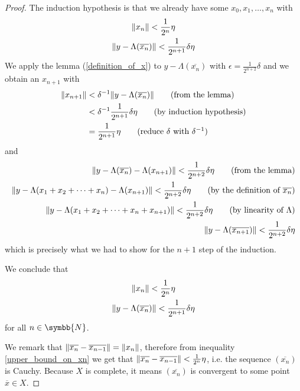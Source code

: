 \documentclass[a4paper, 12pt]{article}
\theoremstyle{definition}
\newcommand{\naturals}{\symbb{N}}
\DeclarePairedDelimiter{\norm}{\lVert}{\rVert}
\begin{document}
\begin{proof}
The induction hypothesis is that we already have some \(x_0, x_1, \dots, x_n\) with
\begin{gather*}
    \norm{x_n} < \frac{1}{2^n} \eta \\
    \norm{y - \Lambda(\overline{x_n})} < \frac{1}{2^{n + 1}} \delta\eta
\end{gather*}
We apply the lemma (\ref{definition_of_x}) to \(y - \Lambda(\overline{x_n})\) with \(\epsilon = \frac{1}{2^{n + 2}} \delta\) and we obtain an \(x_{n + 1}\) with
\begin{align*}
    \norm{x_{n + 1}} &< \delta^{-1} \norm{y - \Lambda(\overline{x_n})} \tag{from the lemma} \\
    &< \delta^{-1} \frac{1}{2^{n + 1}} \delta \eta \tag{by induction hypothesis} \\
    &= \frac{1}{2^{n + 1}} \eta \tag{reduce \(\delta\) with \(\delta^{-1}\)}
\end{align*}
and
\begin{align*}
    \norm{y - \Lambda(\overline{x_n}) - \Lambda(x_{n + 1})}  < \frac{1}{2^{n + 2}} \delta \eta \tag{from the lemma} \\
    \norm{y - \Lambda(x_1 + x_2 + \dots + x_n) - \Lambda(x_{n + 1})} < \frac{1}{2^{n + 2}} \delta \eta \tag{by the definition of \(\overline{x_n}\)} \\
    \norm{y - \Lambda(x_1 + x_2 + \dots + x_n + x_{n + 1})} < \frac{1}{2^{n + 2}} \delta \eta \tag{by linearity of \(\Lambda\)} \\
    \norm{y - \Lambda(\overline{x_{n + 1}})} < \frac{1}{2^{n + 2}} \delta \eta
\end{align*}
which is precisely what we had to show for the \(n + 1\) step of the induction.

We conclude that
\begin{gather}
    \label{upper_bound_on_xn}
    \norm{x_n} < \frac{1}{2^n} \eta \\
    \label{upper_bound_on_y_minus_lambda_xn}
    \norm{y - \Lambda(\overline{x_n})} < \frac{1}{2^{n + 1}} \delta \eta
\end{gather}
for all \(n \in \naturals\).

We remark that \(\norm{\overline{x_n} - \overline{x_{n - 1}}} = \norm{x_n}\), therefore from inequality \ref{upper_bound_on_xn} we get that \(\norm{\overline{x_n} - \overline{x_{n - 1}}} < \frac{1}{2^n} \eta\), i.e. the sequence \((\overline{x_n})\) is Cauchy. Because \(X\) is complete, it means \((\overline{x_n})\) is convergent to some point \(\overline{x} \in X\).


\end{proof}
\end{document}
